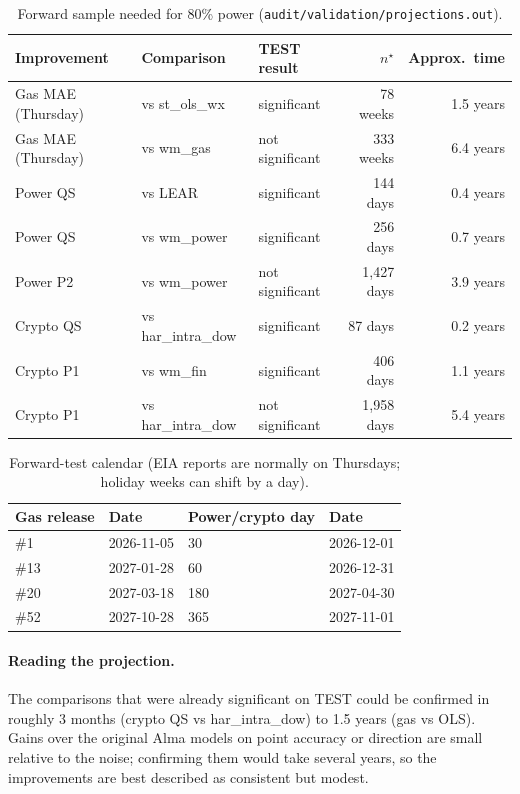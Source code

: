 \documentclass[10pt,a4paper]{article}
\newcommand{\src}[1]{{\footnotesize\texttt{#1}}}
\begin{document}
\begin{table}[H]
\centering\small
\caption{Forward sample needed for 80\% power (\src{audit/validation/projections.out}).}
\label{tab:proj}
\begin{tabular}{@{}lllrr@{}}
\toprule
Improvement & Comparison & TEST result & $n^\star$ & Approx.\ time\\
\midrule
Gas MAE (Thursday) & vs st\_ols\_wx & significant & 78 weeks & 1.5 years\\
Gas MAE (Thursday) & vs wm\_gas & not significant & 333 weeks & 6.4 years\\
Power QS & vs LEAR & significant & 144 days & 0.4 years\\
Power QS & vs wm\_power & significant & 256 days & 0.7 years\\
Power P2 & vs wm\_power & not significant & 1,427 days & 3.9 years\\
Crypto QS & vs har\_intra\_dow & significant & 87 days & 0.2 years\\
Crypto P1 & vs wm\_fin & significant & 406 days & 1.1 years\\
Crypto P1 & vs har\_intra\_dow & not significant & 1,958 days & 5.4 years\\
\bottomrule
\end{tabular}
\end{table}

\begin{table}[H]
\centering\small
\caption{Forward-test calendar (EIA reports are normally on Thursdays; holiday weeks can shift by a day).}
\label{tab:calendar}
\begin{tabular}{@{}ll@{\hspace{2cm}}ll@{}}
\toprule
Gas release & Date & Power/crypto day & Date\\
\midrule
\#1 & 2026-11-05 & 30 & 2026-12-01\\
\#13 & 2027-01-28 & 60 & 2026-12-31\\
\#20 & 2027-03-18 & 180 & 2027-04-30\\
\#52 & 2027-10-28 & 365 & 2027-11-01\\
\bottomrule
\end{tabular}
\end{table}

\paragraph{Reading the projection.} The comparisons that were already significant on TEST could be confirmed in roughly 3 months (crypto QS vs har\_intra\_dow) to 1.5 years (gas vs OLS). Gains over the original Alma models on point accuracy or direction are small relative to the noise; confirming them would take several years, so the improvements are best described as consistent but modest.
\end{document}
